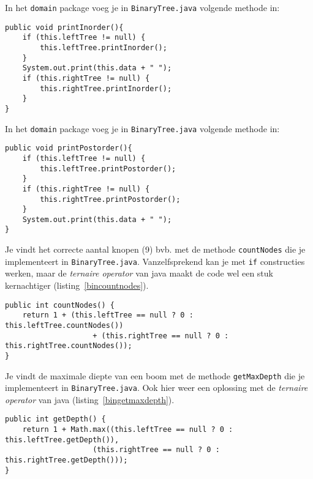 \begin{Oplossing}{2.3}
In het \verb+domain+ package voeg je in \verb+BinaryTree.java+ volgende methode in:
\begin{lstlisting}[caption={In-order doorloop van een binaire boom}, label=bininorder]
public void printInorder(){
	if (this.leftTree != null) {
		this.leftTree.printInorder();
	}
	System.out.print(this.data + " ");
	if (this.rightTree != null) {
		this.rightTree.printInorder();
	}
}
\end{lstlisting}

\end{Oplossing}
\begin{Oplossing}{2.4}
In het \verb+domain+ package voeg je in \verb+BinaryTree.java+ volgende methode in:
\begin{lstlisting}[caption={Post-order doorloop van een binaire boom}, label=binpostorder]
public void printPostorder(){
	if (this.leftTree != null) {
		this.leftTree.printPostorder();
	}
	if (this.rightTree != null) {
		this.rightTree.printPostorder();
	}
	System.out.print(this.data + " ");
}
\end{lstlisting}
\end{Oplossing}
\begin{Oplossing}{2.5}
Je vindt het correcte aantal knopen (9) bvb. met de methode \verb+countNodes+ die je implementeert in \verb+BinaryTree.java+. Vanzelfsprekend kan je met \verb+if+ constructies werken, maar de \emph{ternaire operator} van java maakt de code wel een stuk kernachtiger (listing~\ref{bincountnodes}).
\begin{lstlisting}[caption={Tel het aantal knopen in een binaire boom}, label=bincountnodes]
public int countNodes() {
	return 1 + (this.leftTree == null ? 0 : this.leftTree.countNodes())
					+ (this.rightTree == null ? 0 : this.rightTree.countNodes());
}
\end{lstlisting}
\end{Oplossing}
\begin{Oplossing}{2.6}
Je vindt de maximale diepte van een boom met de methode \verb+getMaxDepth+ die je implementeert in \verb+BinaryTree.java+. Ook hier weer een oplossing met de \emph{ternaire operator} van java (listing~\ref{bingetmaxdepth}).
\begin{lstlisting}[caption={De diepte van een binaire boom}, label=bingetmaxdepth]
public int getDepth() {
	return 1 + Math.max((this.leftTree == null ? 0 : this.leftTree.getDepth()),
					(this.rightTree == null ? 0 : this.rightTree.getDepth()));
}
\end{lstlisting}

\end{Oplossing}
